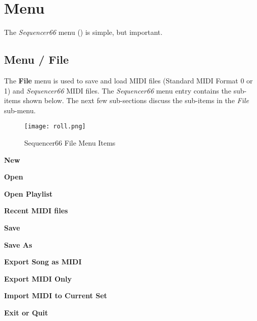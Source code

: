 %
%
%

\section{Menu}
\label{sec:seq66_menu}

   The \textsl{Sequencer66} menu
   () is simple, but important.

\subsection{Menu / File}
\label{subsec:seq66_menu_file}

   The \textbf{File} menu is used to save and load MIDI files
   (Standard MIDI Format 0 or 1) and \textsl{Sequencer66} MIDI
   files.
   The \textsl{Sequencer66} menu entry contains the sub-items shown below.
   The next few sub-sections discuss
   the sub-items in the \textsl{File} sub-menu.

\begin{figure}[H]
   \centering 
   \texttt{[image: roll.png]}
   \caption{Sequencer66 File Menu Items}
   \label{fig:seq66_menu_file_items}
\end{figure}

   \begin{enumber}
      \item \textbf{New}
      \item \textbf{Open}
      \item \textbf{Open Playlist}
      \item \textbf{Recent MIDI files}
      \item \textbf{Save}
      \item \textbf{Save As}
      \item \textbf{Export Song as MIDI}
      \item \textbf{Export MIDI Only}
      \item \textbf{Import MIDI to Current Set}
      \item \textbf{Exit or Quit}
   \end{enumber}

